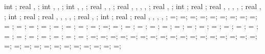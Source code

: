 {{int \foundshowsuppshade;
real \pinnedy, \aaa;
int \showleftpinsup, \showrightpinsup, \showbottompinsup;
int \nbotpin, \ibot, \ijkk;
real \botpinx, \botpinspace, \bottomlength;
real \lefttriw, \leftlinew, \leftlined, \leftlinet, \leftradratio;
real \leftxvalue, \leftyvalue;
int \leftshowcircle;
real \leftrotpin;
real \righttriw, \rightlinew, \rightlined, \rightlinet, \rightradratio;
real \rightxvalue, \rightyvalue;
int \rightshowcircle;
real \rightrotpin;
real \bottomtriw, \bottomlinew, \bottomlined, \bottomlinet, \bottomradratio;
real \bottomxvalue, \bottomyvalue;
int \bottomshowcircle;
real \bottomrotpin;
real \hsdistleft, \hsdistright, \hsdistbottom, \hsinnerlinethk, \thinlinethk;
\hsdistleft=\hsdistleft;
\hsdistright=\hsdistright;
\hsdistbottom=\hsdistbottom;
\hsinnerlinethk=\hsinnerlinethk;
\thinlinethk=\thinlinethk;
\hsdistleft=\hsdistleft;
\hsdistright=\hsdistright;
\hsdistbottom=\hsdistbottom;
\hsinnerlinethk=\hsinnerlinethk;
\storyheight = \storyheight;
\baywidth = \baywidth;
\startx = \startx;
\starty = \starty;
\supportwidth = \supportwidth;
\supportheight = \supportheight;
\isolationwidth = \isolationwidth;
\isolationdepth = \isolationdepth;
\isoshift=\isoshift;
\foundationdepth = \foundationdepth;
\linet = \linet;
\beamlinet = \beamlinet;
\collinet = \collinet;
\baselinet = \baselinet;
\isolinet = \isolinet;
\massrad = \massrad;
\foundsidew = \foundsidew;
\leftsoildist = \leftsoildist;
\rightsoildist = \rightsoildist;
\leftsoildepth = \leftsoildepth;
\rightsoildepth = \rightsoildepth;
\soilbelowfound = \soilbelowfound;
\leftcontrolx = \leftcontrolx;
\leftcontroly = \leftcontroly;
\rightcontrolx = \rightcontrolx;
\rightcontroly = \rightcontroly;
\axeslenX = \axeslenX;
\axeslenY = \axeslenY;
\piledepth=\piledepth;
\pilesidespace=\pilesidespace;
\pilediameter=\pilediameter;
\pilelinethickness=\pilelinethickness;
\pblinet=\pblinet;
\latloadshift=\latloadshift;
\toparrlen=\toparrlen;
\basearrlen=\basearrlen;
\drift=\drift;
=;
=;
=;
\engbedrockdepth=\engbedrockdepth;
\engbedrockleftdist=\engbedrockleftdist;
\engbedrockrightdist=\engbedrockrightdist;
\engbedrocklinewidth=\engbedrocklinewidth;
\translayerlinet=\translayerlinet;
\ssinterlinet=\ssinterlinet;
\markssexspace=\markssexspace;
\markssrad=\markssrad;
\marksslinet=\marksslinet;
\supershadespace=\supershadespace;
\shearwalllinet=\shearwalllinet;
\marksuperexspace=\marksuperexspace;
\marksuperrad=\marksuperrad;
\marksuperlinet=\marksuperlinet;
\phorspbtwspr=\phorspbtwspr;
\phorspringspace=\phorspringspace;
\phortextshiftx=\phortextshiftx;
}}
